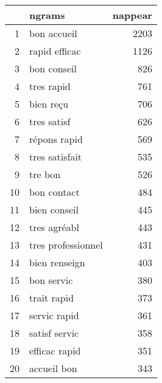 \begin{tabular}{|r|l|r|}
  \hline
 & ngrams & nappear \\ 
  \hline
1 & bon accueil & 2203 \\ 
  2 & rapid efficac & 1126 \\ 
  3 & bon conseil & 826 \\ 
  4 & tres rapid & 761 \\ 
  5 & bien reçu & 706 \\ 
  6 & tres satisf & 626 \\ 
  7 & répons rapid & 569 \\ 
  8 & tres satisfait & 535 \\ 
  9 & tre bon & 526 \\ 
  10 & bon contact & 484 \\ 
  11 & bien conseil & 445 \\ 
  12 & tres agréabl & 443 \\ 
  13 & tres professionnel & 431 \\ 
  14 & bien renseign & 403 \\ 
  15 & bon servic & 380 \\ 
  16 & trait rapid & 373 \\ 
  17 & servic rapid & 361 \\ 
  18 & satisf servic & 358 \\ 
  19 & efficac rapid & 351 \\ 
  20 & accueil bon & 343 \\ 
   \hline
\end{tabular}
